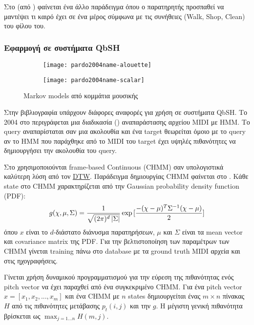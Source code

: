 Στο  (από \cite{wikiHMM}) φαίνεται ένα άλλο παράδειγμα \hmm{} όπου ο παρατηρητής προσπαθεί να μαντέψει τι καιρό έχει σε ένα μέρος σύμφωνα με τις συνήθειες (Walk, Shop, Clean) του φίλου του.

\subsubsection{Εφαρμογή σε συστήματα QbSH}
\begin{figure}[htb]
    \centering
    \begin{subfigure}{0.45\linewidth}
        \texttt{[image: pardo2004name-alouette]}
    \end{subfigure}\hfill
    \begin{subfigure}{0.45\linewidth}
        \texttt{[image: pardo2004name-scalar]}
    \end{subfigure}
    \caption{Markov models από κομμάτια μουσικής \protect\cite{pardo2004name}}
    \label{fig:pardo2004name-alouette}
\end{figure}

Στην βιβλιογραφία υπάρχουν διάφορες αναφορές για χρήση \hmm{} σε συστήματα QbSH.
Το 2004 στο \cite{pardo2004name} περιγράφεται μια διαδικασία () αναπαράστασης αρχείου MIDI με HMM.
Το query αναπαρίσταται σαν μια ακολουθία και ένα target θεωρείται όμοιο με το query αν το HMM που παράχθηκε από το MIDI του target έχει υψηλές πιθανότητες να δημιουργήσει την ακολουθία του query.

Στο \cite{jang2005continuous} χρησιμοποιούνται frame-based Continuous \hmm{} (CHMM) σαν υπολογιστικά καλύτερη λύση από τον \hyperref[sub:DTW]{DTW}.
Παράδειγμα δημιουργίας CHMM φαίνεται στο .
Κάθε state στο CHMM χαρακτηρίζεται από την Gaussian probability density function (PDF):
\begin{equation*}
    g(\chi, \mu, \Sigma) = \frac{1}{\sqrt{(2\pi)^d\left\lvert\Sigma\right\rvert}} \exp{[\frac{-(\chi-\mu)^T\Sigma^{-1}(\chi-\mu)}{2}]}
\end{equation*}
όπου $x$ είναι το $d$-διάστατο διάνυσμα παρατηρήσεων, $\mu$ και $\Sigma$ είναι τα mean vector και covariance matrix της PDF.
Για την βελτιστοποίηση των παραμέτρων των CHMM γίνεται training πάνω στο database με τα ground truth MIDI αρχεία και στις ηχογραφήσεις.

Γίνεται χρήση δυναμικού προγραμματισμού για την εύρεση της πιθανότητας ενός pitch vector να έχει παραχθεί από ένα συγκεκριμένο CHMM.
Για ένα pitch vector $x = [x_1, x_2, ..., x_m]$ και ένα CHMM με $n$ states δημιουργείται ένας $m \times n$ πίνακας $H$ από τις πιθανότητες μετάβασης $p_t(i,j)$ και την $g$.
Η μέγιστη γενική πιθανότητα βρίσκεται ως $\max_{j=1...n}{H(m,j)}$.

